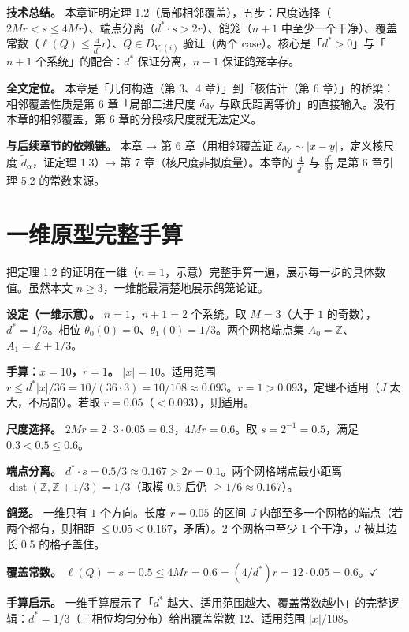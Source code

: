 \documentclass[a4paper,11pt,openany]{ctexbook}
\numberwithin{equation}{chapter}
\numberwithin{figure}{chapter}
\numberwithin{table}{chapter}
\begin{document}
\textbf{技术总结。} 本章证明定理 1.2（局部相邻覆盖），五步：尺度选择（$2Mr<s\le4Mr$）、端点分离（$d^*\cdot s>2r$）、鸽笼（$n+1$ 中至少一个干净）、覆盖常数（$\ell(Q)\le\frac4{d^*}r$）、$Q\in D_{V,(i)}$ 验证（两个 case）。核心是「$d^*>0$」与「$n+1$ 个系统」的配合：$d^*$ 保证分离，$n+1$ 保证鸽笼幸存。

\textbf{全文定位。} 本章是「几何构造（第 3、4 章）」到「核估计（第 6 章）」的桥梁：相邻覆盖性质是第 6 章「局部二进尺度 $\delta_{\rm dy}$ 与欧氏距离等价」的直接输入。没有本章的相邻覆盖，第 6 章的分段核尺度就无法定义。

\textbf{与后续章节的依赖链。} 本章 → 第 6 章（用相邻覆盖证 $\delta_{\rm dy}\sim|x-y|$，定义核尺度 $\widetilde d_\alpha$，证定理 1.3）→ 第 7 章（核尺度非拟度量）。本章的 $\frac4{d^*}$ 与 $\frac{d^*}{36}$ 是第 6 章引理 5.2 的常数来源。

\section{一维原型完整手算}

把定理 1.2 的证明在一维（$n=1$，示意）完整手算一遍，展示每一步的具体数值。虽然本文 $n\ge3$，一维能最清楚地展示鸽笼论证。

\textbf{设定（一维示意）。} $n=1$，$n+1=2$ 个系统。取 $M=3$（大于 $1$ 的奇数），$d^*=1/3$。相位 $\theta_0(0)=0$、$\theta_1(0)=1/3$。两个网格端点集 $A_0=\mathbb Z$、$A_1=\mathbb Z+1/3$。

\textbf{手算：$x=10$，$r=1$。} $|x|=10$。适用范围 $r\le d^*|x|/36=10/(36\cdot3)=10/108\approx0.093$。$r=1>0.093$，定理不适用（$J$ 太大，不局部）。若取 $r=0.05$（$<0.093$），则适用。

\textbf{尺度选择。} $2Mr=2\cdot3\cdot0.05=0.3$，$4Mr=0.6$。取 $s=2^{-1}=0.5$，满足 $0.3<0.5\le0.6$。

\textbf{端点分离。} $d^*\cdot s=0.5/3\approx0.167>2r=0.1$。两个网格端点最小距离 $\operatorname{dist}(\mathbb Z,\mathbb Z+1/3)=1/3$（取模 $0.5$ 后仍 $\ge1/6\approx0.167$）。

\textbf{鸽笼。} 一维只有 $1$ 个方向。长度 $r=0.05$ 的区间 $J$ 内部至多一个网格的端点（若两个都有，则相距 $\le0.05<0.167$，矛盾）。$2$ 个网格中至少 $1$ 个干净，$J$ 被其边长 $0.5$ 的格子盖住。

\textbf{覆盖常数。} $\ell(Q)=s=0.5\le4Mr=0.6=(4/d^*)r=12\cdot0.05=0.6$。$\checkmark$

\textbf{手算启示。} 一维手算展示了「$d^*$ 越大、适用范围越大、覆盖常数越小」的完整逻辑：$d^*=1/3$（三相位均匀分布）给出覆盖常数 $12$、适用范围 $|x|/108$。
\end{document}
